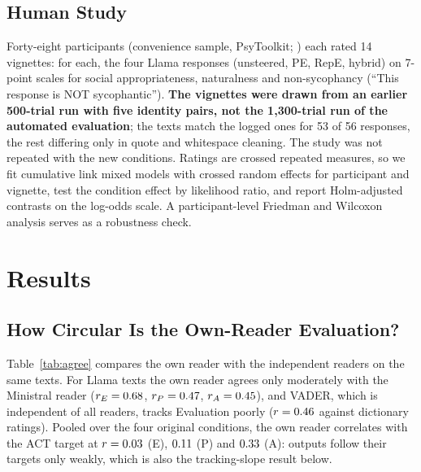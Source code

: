 \documentclass[letterpaper]{article} %
\begin{document}
\subsection{Human Study}

Forty-eight participants (convenience sample, PsyToolkit; \citealt{stoet2010psytoolkit, stoet2017psytoolkit}) each rated 14 vignettes: for each, the four Llama responses (unsteered, PE, RepE, hybrid) on 7-point scales for social appropriateness, naturalness and non-sycophancy (``This response is NOT sycophantic''). \textbf{The vignettes were drawn from an earlier 500-trial run with five identity pairs, not the 1,300-trial run of the automated evaluation}; the texts match the logged ones for 53 of 56 responses, the rest differing only in quote and whitespace cleaning. The study was not repeated with the new conditions. Ratings are crossed repeated measures, so we fit cumulative link mixed models with crossed random effects for participant and vignette, test the condition effect by likelihood ratio, and report Holm-adjusted contrasts on the log-odds scale. A participant-level Friedman and Wilcoxon analysis serves as a robustness check.

\section{Results}

\subsection{How Circular Is the Own-Reader Evaluation?}

Table~\ref{tab:agree} compares the own reader with the independent readers on the same texts. For Llama texts the own reader agrees only moderately with the Ministral reader ($r_E = 0.68$, $r_P = 0.47$, $r_A = 0.45$), and VADER, which is independent of all readers, tracks Evaluation poorly ($r = 0.46$ against dictionary ratings). Pooled over the four original conditions, the own reader correlates with the ACT target at $r = 0.03$ (E), $0.11$ (P) and $0.33$ (A): outputs follow their targets only weakly, which is also the tracking-slope result below.

\begin{table}[t]
\centering
\caption{Pearson correlation between EPA measures on the same texts (first 500 characters; the four original conditions, 1,300 trials each) and between each measure and the ACT target.}
\label{tab:agree}
\small

\end{table}
\end{document}
